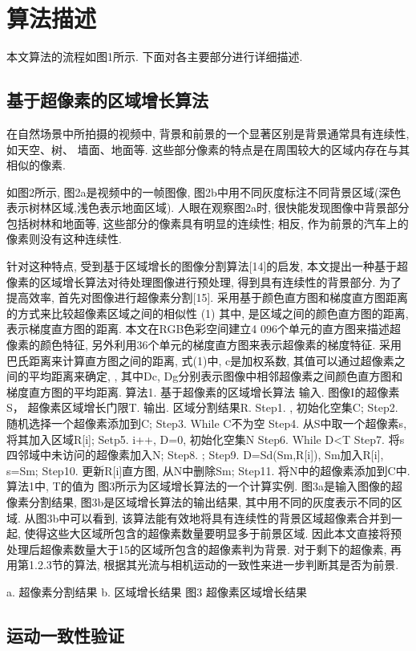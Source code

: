 \section{算法描述}
\label{ch5:sec:algorithm}
本文算法的流程如图1所示. 下面对各主要部分进行详细描述.
\subsection{基于超像素的区域增长算法}
在自然场景中所拍摄的视频中, 背景和前景的一个显著区别是背景通常具有连续性, 如天空、树、 墙面、地面等. 这些部分像素的特点是在周围较大的区域内存在与其相似的像素.\par
 如图2所示, 图2a是视频中的一帧图像, 图2b中用不同灰度标注不同背景区域(深色表示树林区域,浅色表示地面区域). 人眼在观察图2a时, 很快能发现图像中背景部分包括树林和地面等, 这些部分的像素具有明显的连续性; 相反, 作为前景的汽车上的像素则没有这种连续性.\par
 针对这种特点, 受到基于区域增长的图像分割算法[14]的启发, 本文提出一种基于超像素的区域增长算法对待处理图像进行预处理, 得到具有连续性的背景部分. 为了提高效率, 首先对图像进行超像素分割[15]. 采用基于颜色直方图和梯度直方图距离的方式来比较超像素区域之间的相似性
	 	(1)
其中, 是区域之间的颜色直方图的距离, 表示梯度直方图的距离. 本文在RGB色彩空间建立4 096个单元的直方图来描述超像素的颜色特征, 另外利用36个单元的梯度直方图来表示超像素的梯度特征. 采用巴氏距离来计算直方图之间的距离, 式(1)中, c是加权系数, 其值可以通过超像素之间的平均距离来确定,  , 其中Dc, Dg分别表示图像中相邻超像素之间颜色直方图和梯度直方图的平均距离.
算法1. 基于超像素的区域增长算法
输入. 图像I的超像素S， 超像素区域增长门限T.
输出. 区域分割结果R.
Step1.  , 初始化空集C;
Step2. 随机选择一个超像素添加到C;
Step3. While C不为空{
Step4. 从S中取一个超像素s, 将其加入区域R[i];
Setp5. i++, D=0, 初始化空集N
Step6. While D<T {
Step7. 将s四邻域中未访问的超像素加入N;
Step8.  ;
Step9. D=Sd(Sm,R[i]), Sm加入R[i], s=Sm;
Step10. 更新R[i]直方图, 从N中删除Sm;}
Step11. 将N中的超像素添加到C中}.
算法1中, T的值为  图3所示为区域增长算法的一个计算实例. 图3a是输入图像的超像素分割结果, 图3b是区域增长算法的输出结果, 其中用不同的灰度表示不同的区域. 从图3b中可以看到, 该算法能有效地将具有连续性的背景区域超像素合并到一起, 使得这些大区域所包含的超像素数量要明显多于前景区域. 因此本文直接将预处理后超像素数量大于15的区域所包含的超像素判为背景. 对于剩下的超像素, 再用第1.2.3节的算法, 根据其光流与相机运动的一致性来进一步判断其是否为前景.


a. 超像素分割结果         b. 区域增长结果
图3  超像素区域增长结果

\subsection{运动一致性验证}
\label{ch5:sec:sub:motionv}
 
